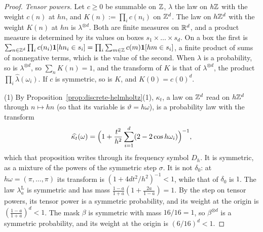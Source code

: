 \begin{proof}
\leanok
{}
\emph{Tensor powers.} Let $c \ge 0$ be summable on $\mathbb{Z}$, $\lambda$ the law on $h\mathbb{Z}$ with the
weight $c(n)$ at $hn$, and $K(n) := \prod_ic(n_i)$ on $\mathbb{Z}^d$. The law on $h\mathbb{Z}^d$ with the
weight $K(n)$ at $hn$ is $\lambda^{\otimes d}$. Both are finite measures on $\mathbb{R}^d$, and a product
measure is determined by its values on boxes $s_1 \times \dots \times s_d$. On a box the first is
$\sum_{n \in \mathbb{Z}^d}\prod_ic(n_i)\mathbf{1}[hn_i \in s_i] = \prod_i\sum_{m \in \mathbb{Z}}
c(m)\mathbf{1}[hm \in s_i]$, a finite product of sums of nonnegative terms, which is the value of
the second. When $\lambda$ is a probability, so is $\lambda^{\otimes d}$, so $\sum_nK(n) = 1$, and
the transform of $K$ is that of $\lambda^{\otimes d}$, the product $\prod_i\widehat{\lambda}(\omega_i)$.
If $c$ is symmetric, so is $K$, and $K(0) = c(0)^d$.

(1) By Proposition~\ref{prop:discrete-helmholtz}(1), $\kappa_t$, a law on $\mathbb{Z}^d$ read on $h\mathbb{Z}^d$
through $n \mapsto hn$ (so that its variable is $\vartheta = h\omega$), is a probability law with the
transform
\[
\widehat{\kappa_t}(\omega) = \Bigl(1 + \frac{t^2}{h^2}\sum_{i=1}^d(2 - 2\cos h\omega_i)\Bigr)^{-1},
\]
which that proposition writes through its frequency symbol $D_h$. It is symmetric, as a mixture of
the powers of the symmetric step $\sigma$. It is not $\delta_0$: at $h\omega = (\pi, \dots, \pi)$
its transform is $(1 + 4dt^2/h^2)^{-1} < 1$, while that of $\delta_0$ is $1$. The law
$\lambda^{\mathrm L}_a$ is symmetric and has mass $\tfrac{1-a}{1+a}(1 + \tfrac{2a}{1-a}) = 1$. By
the step on tensor powers, its tensor power is a symmetric probability, and its weight at the origin
is $(\tfrac{1-a}{1+a})^d < 1$. The mask $\beta$ is symmetric with mass $16/16 = 1$, so
$\beta^{\otimes d}$ is a symmetric probability, and its weight at the origin is $(6/16)^d < 1$.


\end{proof}

